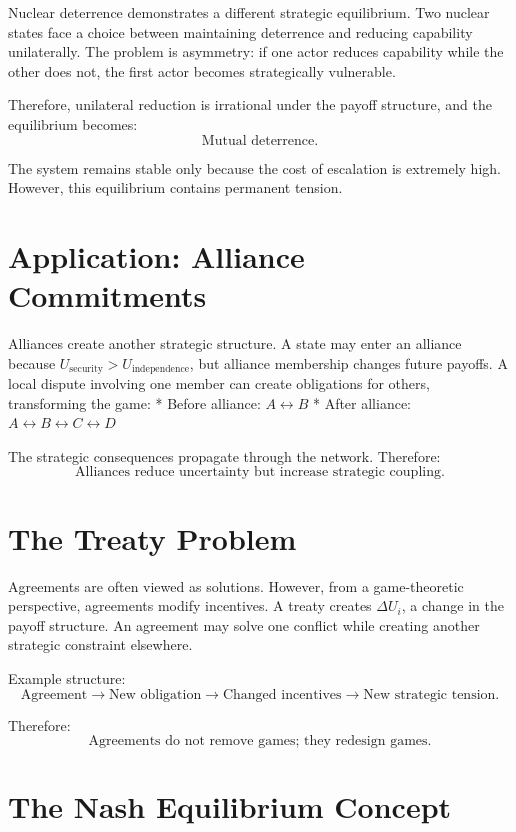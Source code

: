 \documentclass[11pt,openany]{book}
\theoremstyle{plain}
\theoremstyle{definition}
\begin{document}
Nuclear deterrence demonstrates a different strategic equilibrium. Two nuclear states face a choice between maintaining deterrence and reducing capability unilaterally. The problem is asymmetry: if one actor reduces capability while the other does not, the first actor becomes strategically vulnerable.

Therefore, unilateral reduction is irrational under the payoff structure, and the equilibrium becomes:
\[
\boxed{
\text{Mutual deterrence.}
}
\]

The system remains stable only because the cost of escalation is extremely high. However, this equilibrium contains permanent tension.

\section*{Application: Alliance Commitments}

Alliances create another strategic structure. A state may enter an alliance because \(U_{\text{security}} > U_{\text{independence}}\), but alliance membership changes future payoffs. A local dispute involving one member can create obligations for others, transforming the game:
* Before alliance: \(A \leftrightarrow B\)
* After alliance: \(A \leftrightarrow B \leftrightarrow C \leftrightarrow D\)

The strategic consequences propagate through the network. Therefore:
\[
\boxed{
\text{Alliances reduce uncertainty but increase strategic coupling.}
}
\]

\section*{The Treaty Problem}

Agreements are often viewed as solutions. However, from a game-theoretic perspective, agreements modify incentives. A treaty creates \(\Delta U_i\), a change in the payoff structure. An agreement may solve one conflict while creating another strategic constraint elsewhere. 

Example structure:
\[
\text{Agreement}
\longrightarrow
\text{New obligation}
\longrightarrow
\text{Changed incentives}
\longrightarrow
\text{New strategic tension}.
\]

Therefore:
\[
\boxed{
\text{Agreements do not remove games; they redesign games.}
}
\]

\section*{The Nash Equilibrium Concept}
\end{document}
